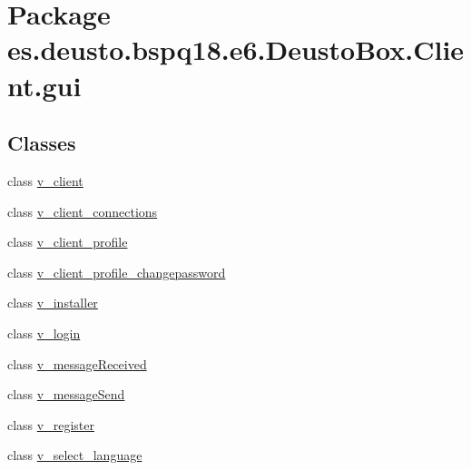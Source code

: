 \hypertarget{namespacees_1_1deusto_1_1bspq18_1_1e6_1_1_deusto_box_1_1_client_1_1gui}{}\section{Package es.\+deusto.\+bspq18.\+e6.\+Deusto\+Box.\+Client.\+gui}
\label{namespacees_1_1deusto_1_1bspq18_1_1e6_1_1_deusto_box_1_1_client_1_1gui}
\subsection*{Classes}
\begin{DoxyCompactItemize}
\item 
class \mbox{\hyperlink{classes_1_1deusto_1_1bspq18_1_1e6_1_1_deusto_box_1_1_client_1_1gui_1_1v__client}{v\+\_\+client}}
\item 
class \mbox{\hyperlink{classes_1_1deusto_1_1bspq18_1_1e6_1_1_deusto_box_1_1_client_1_1gui_1_1v__client__connections}{v\+\_\+client\+\_\+connections}}
\item 
class \mbox{\hyperlink{classes_1_1deusto_1_1bspq18_1_1e6_1_1_deusto_box_1_1_client_1_1gui_1_1v__client__profile}{v\+\_\+client\+\_\+profile}}
\item 
class \mbox{\hyperlink{classes_1_1deusto_1_1bspq18_1_1e6_1_1_deusto_box_1_1_client_1_1gui_1_1v__client__profile__changepassword}{v\+\_\+client\+\_\+profile\+\_\+changepassword}}
\item 
class \mbox{\hyperlink{classes_1_1deusto_1_1bspq18_1_1e6_1_1_deusto_box_1_1_client_1_1gui_1_1v__installer}{v\+\_\+installer}}
\item 
class \mbox{\hyperlink{classes_1_1deusto_1_1bspq18_1_1e6_1_1_deusto_box_1_1_client_1_1gui_1_1v__login}{v\+\_\+login}}
\item 
class \mbox{\hyperlink{classes_1_1deusto_1_1bspq18_1_1e6_1_1_deusto_box_1_1_client_1_1gui_1_1v__message_received}{v\+\_\+message\+Received}}
\item 
class \mbox{\hyperlink{classes_1_1deusto_1_1bspq18_1_1e6_1_1_deusto_box_1_1_client_1_1gui_1_1v__message_send}{v\+\_\+message\+Send}}
\item 
class \mbox{\hyperlink{classes_1_1deusto_1_1bspq18_1_1e6_1_1_deusto_box_1_1_client_1_1gui_1_1v__register}{v\+\_\+register}}
\item 
class \mbox{\hyperlink{classes_1_1deusto_1_1bspq18_1_1e6_1_1_deusto_box_1_1_client_1_1gui_1_1v__select__language}{v\+\_\+select\+\_\+language}}
\end{DoxyCompactItemize}
